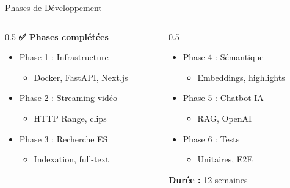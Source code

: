 \documentclass[11pt]{beamer}
\begin{document}
\begin{frame}{Phases de Développement}
\begin{columns}
\begin{column}{0.5\textwidth}
\textbf{✅ Phases complétées}
\begin{itemize}
    \item[$\checkmark$] Phase 1 : Infrastructure
    \begin{itemize}
        \item Docker, FastAPI, Next.js
    \end{itemize}
    \item[$\checkmark$] Phase 2 : Streaming vidéo
    \begin{itemize}
        \item HTTP Range, clips
    \end{itemize}
    \item[$\checkmark$] Phase 3 : Recherche ES
    \begin{itemize}
        \item Indexation, full-text
    \end{itemize}
\end{itemize}
\end{column}

\begin{column}{0.5\textwidth}
\begin{itemize}
    \item[$\checkmark$] Phase 4 : Sémantique
    \begin{itemize}
        \item Embeddings, highlights
    \end{itemize}
    \item[$\checkmark$] Phase 5 : Chatbot IA
    \begin{itemize}
        \item RAG, OpenAI
    \end{itemize}
    \item[$\checkmark$] Phase 6 : Tests
    \begin{itemize}
        \item Unitaires, E2E
    \end{itemize}
\end{itemize}

\vspace{0.3cm}

\textbf{Durée :} 12 semaines
\end{column}
\end{columns}
\end{frame}
\end{document}
